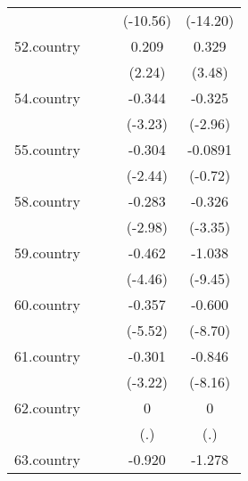 {\begin{tabular}{l*{4}{c}}
            &                     &                     &    (-10.56)         &    (-14.20)         \\
[1em]
52.country  &                     &                     &       0.209\sym{*}  &       0.329\sym{***}\\
            &                     &                     &      (2.24)         &      (3.48)         \\
[1em]
54.country  &                     &                     &      -0.344\sym{**} &      -0.325\sym{**} \\
            &                     &                     &     (-3.23)         &     (-2.96)         \\
[1em]
55.country  &                     &                     &      -0.304\sym{*}  &     -0.0891         \\
            &                     &                     &     (-2.44)         &     (-0.72)         \\
[1em]
58.country  &                     &                     &      -0.283\sym{**} &      -0.326\sym{***}\\
            &                     &                     &     (-2.98)         &     (-3.35)         \\
[1em]
59.country  &                     &                     &      -0.462\sym{***}&      -1.038\sym{***}\\
            &                     &                     &     (-4.46)         &     (-9.45)         \\
[1em]
60.country  &                     &                     &      -0.357\sym{***}&      -0.600\sym{***}\\
            &                     &                     &     (-5.52)         &     (-8.70)         \\
[1em]
61.country  &                     &                     &      -0.301\sym{**} &      -0.846\sym{***}\\
            &                     &                     &     (-3.22)         &     (-8.16)         \\
[1em]
62.country  &                     &                     &           0         &           0         \\
            &                     &                     &         (.)         &         (.)         \\
[1em]
63.country  &                     &                     &      -0.920\sym{***}&      -1.278\sym{***}\\

\end{tabular}}
